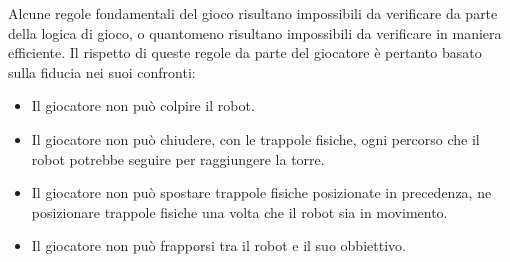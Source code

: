 Alcune regole fondamentali del gioco risultano impossibili da verificare da parte della logica di gioco, o quantomeno risultano impossibili da verificare in maniera efficiente. Il rispetto di queste regole da parte del giocatore è pertanto basato sulla fiducia nei suoi confronti:
	\begin{itemize}
	\item Il giocatore non può colpire il robot.
	\item Il giocatore non può chiudere, con le trappole fisiche, ogni percorso che il robot potrebbe seguire per raggiungere la torre.
	\item Il giocatore non può spostare trappole fisiche posizionate in precedenza, ne posizionare trappole fisiche una volta che il robot sia in movimento.
	\item Il giocatore non può frapporsi tra il robot e il suo obbiettivo.
	\end{itemize}
